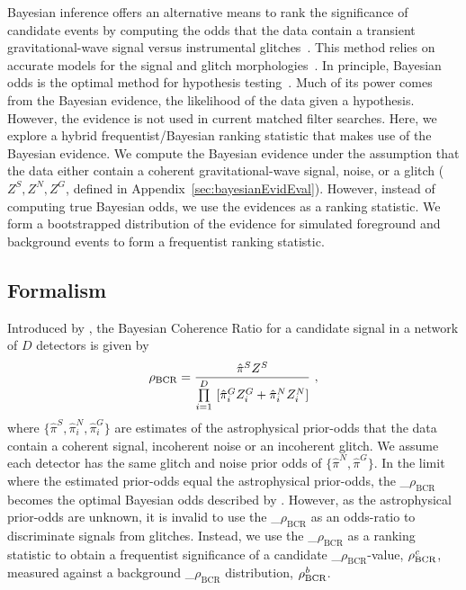 \documentclass[useAMS,fleqn, usenatbib, final]{mnras}
\newcommand{\mathcmd}[1]{{\sc \relax\ifmmode#1\else $#1$\fi}\xspace}
\newcommand{\bcr}{\mathcmd{\rho_\text{BCR}}}
\newcommand{\bgrdbcr}{\mathcmd{\rho_\text{BCR}^\textit{b}}}
\newcommand{\candbcr}{\mathcmd{\rho_\text{BCR}^\textit{c}}}
\begin{document}
Bayesian inference offers an alternative means to rank the significance of candidate events by computing the odds that the data contain a transient gravitational-wave signal versus instrumental glitches~\citep{BCR1}. This method relies on accurate models for the signal and glitch morphologies~\citep{BCR1}. In principle, Bayesian odds is the optimal method for hypothesis testing~\citep{BCR2}. Much of its power comes from the Bayesian evidence, the likelihood of the data given a hypothesis. However, the evidence is not used in current matched filter searches. Here, we explore a hybrid frequentist/Bayesian ranking statistic that makes use of the Bayesian evidence. We compute the Bayesian evidence under the assumption that the data either contain a coherent gravitational-wave signal, noise, or a glitch ($Z^S, Z^N, Z^G$, defined in Appendix~\ref{sec:bayesianEvidEval}). However, instead of computing true Bayesian odds, we use the evidences as a ranking statistic. We form a bootstrapped distribution of the evidence for simulated foreground and background events to form a frequentist ranking statistic.

\subsection{Formalism}

Introduced by \citet{BCR1}, the Bayesian Coherence Ratio for a candidate signal in a network of $D$ detectors is given by
\begin{equation}
\label{eq:bcr}
\bcr = \frac{\hat{\pi}^S Z^S}{\prod\limits^D_{i=1} \ [\hat{\pi}^G_i Z^G_i + \hat{\pi}^N_i Z^N_i]}\  ,
\end{equation}
where $\{\hat{\pi}^S, \hat{\pi}^N_i, \hat{\pi}^G_i\}$ are estimates of the astrophysical prior-odds that the data contain a coherent signal, incoherent noise or an incoherent glitch. We assume each detector has the same glitch and noise prior odds of $\{\hat{\pi}^N, \hat{\pi}^G\}$. In the limit where the estimated prior-odds equal the astrophysical prior-odds, the \bcr becomes the optimal Bayesian odds described by \citet{BCR2}.  However, as the astrophysical prior-odds are unknown, it is invalid to use the \bcr as an odds-ratio to discriminate signals from glitches. Instead, we use the \bcr as a ranking statistic to obtain a frequentist significance of a candidate \bcr-value, $\candbcr$, measured against a background \bcr distribution, $\bgrdbcr$. 

\end{document}
